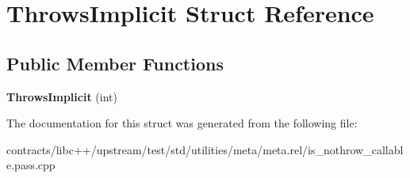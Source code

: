\hypertarget{struct_throws_implicit}{}\section{Throws\+Implicit Struct Reference}
\label{struct_throws_implicit}
\subsection*{Public Member Functions}
\begin{DoxyCompactItemize}
\item 
\mbox{\label{struct_throws_implicit_ad6366e160cc90d16b268fba1d57e72c1}} 
{\bfseries Throws\+Implicit} (int)
\end{DoxyCompactItemize}


The documentation for this struct was generated from the following file\+:\begin{DoxyCompactItemize}
\item 
contracts/libc++/upstream/test/std/utilities/meta/meta.\+rel/is\+\_\+nothrow\+\_\+callable.\+pass.\+cpp\end{DoxyCompactItemize}
